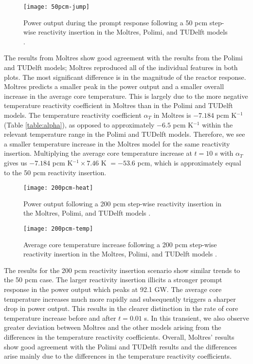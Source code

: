 \begin{figure}[htbp!]
    \centering
    \texttt{[image: 50pcm-jump]}
    \caption{Power output during the prompt response following
    a 50 pcm step-wise reactivity insertion in the Moltres, Polimi, and
    TUDelft models \cite{fiorina_modelling_2014}.}
    \label{fig:50pcmjump}
\end{figure}

The results from Moltres show good agreement with the results from the Polimi
and TUDelft models; Moltres reproduced all of the individual features in both
plots. The most significant difference is in the magnitude of the reactor
response. Moltres predicts a smaller peak in the power output and a smaller
overall increase in the average core temperature. This is largely due to the
more negative temperature reactivity coefficient in Moltres than in the Polimi
and TUDelft models. The temperature reactivity coefficient $\alpha_T$ in
Moltres is $-7.184$ pcm K$^{-1}$ (Table \ref{table:alpha}), as opposed to
approximately $-6.5$ pcm K$^{-1}$ within the relevant temperature range in the
Polimi and TUDelft models. Therefore, we see a smaller temperature increase in
the Moltres model for the same reactivity insertion. Multiplying the average
core temperature increase at $t=10$ s with $\alpha_T$ gives us $-7.184$ pcm
K$^{-1} \times 7.46$ K $= -53.6$ pcm, which is approximately equal to the 50
pcm reactivity insertion.

\begin{figure}[htbp!]
    \centering
    \texttt{[image: 200pcm-heat]}
    \caption{Power output following
    a 200 pcm step-wise reactivity insertion in the Moltres, Polimi, and
    TUDelft models \cite{fiorina_modelling_2014}.}
    \label{fig:200pcmheat}
%
    \centering
    \texttt{[image: 200pcm-temp]}
    \caption{Average core temperature increase following
    a 200 pcm step-wise reactivity insertion in the Moltres, Polimi, and
    TUDelft models \cite{fiorina_modelling_2014}.}
    \label{fig:200pcmtemp}
\end{figure}

The results for the 200 pcm reactivity insertion scenario show similar trends
to the 50 pcm case. The larger reactivity insertion illicits a stronger
prompt response in the power output which peaks at 92.1 GW. The average core
temperature increases much more rapidly and subsequently triggers a sharper drop in power output. This results in the clearer distinction in the rate of
core temperature increase before and after $t=0.01$ s. In this transient, we
also observe greater deviation between Moltres and the other models arising
from the differences in the temperature reactivity coefficients. Overall,
Moltres' results show good agreement with the Polimi and TUDelft results and
the differences arise mainly due to the differences in the temperature
reactivity coefficients.

